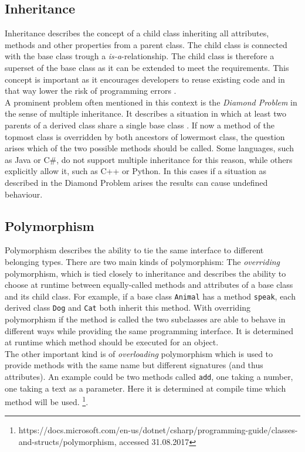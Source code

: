 \subsection{Inheritance}
Inheritance describes the concept of a child class inheriting all attributes, methods and other properties from a parent class. The child class is connected with the base class trough a \emph{is-a}-relationship. The child class is therefore a superset of the base class as it can be extended to meet the requirements. This concept is important as it encourages developers to reuse existing code and in that way lower the risk of programming errors \cite{johnson91}. \\
A prominent problem often mentioned in this context is the \emph{Diamond Problem} in the sense of multiple inheritance. It describes a situation in which at least two parents of a derived class share a single base class \cite{Truyen04}. If now a method of the topmost class is overridden by both ancestors of lowermost class, the question arises which of the two possible methods should be called. Some languages, such as Java or C\#, do not support multiple inheritance for this reason, while others explicitly allow it, such as C++ or Python. In this cases if a situation as described in the Diamond Problem arises the results can cause undefined behaviour.

\subsection{Polymorphism}

Polymorphism describes the ability to tie the same interface to different belonging types. There are two main kinds of polymorphism: The \emph{overriding} polymorphism, which is tied closely to inheritance and describes the ability to choose at runtime between equally-called methods and attributes of a base class and its child class. For example, if a base class \texttt{Animal} has a method \texttt{speak}, each derived class \texttt{Dog} and \texttt{Cat} both inherit this method. With overriding polymorphism if the method is called the two subclasses are able to behave in different ways while providing the same programming interface. It is determined at runtime which method should be executed for an object. \\
The other important kind is of \emph{overloading} polymorphism which is used to provide methods with the same name but different signatures (and thus attributes). An example could be two methods called \texttt{add}, one taking a number, one taking a text as a parameter. Here it is determined at compile time which method will be used. \footnote{https://docs.microsoft.com/en-us/dotnet/csharp/programming-guide/classes-and-structs/polymorphism, accessed 31.08.2017}.

